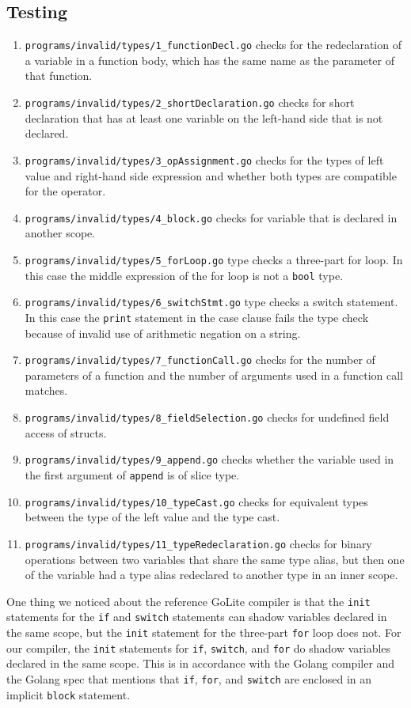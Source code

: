 \documentclass{article}
\begin{document}
\subsection*{Testing}
\begin{enumerate}
	\item \verb|programs/invalid/types/1_functionDecl.go| checks for the redeclaration of a variable in a function body, which has the same name as the parameter of that function.
	\item \verb|programs/invalid/types/2_shortDeclaration.go| checks for short declaration that has at least one variable on the left-hand side that is not declared.
	\item \verb|programs/invalid/types/3_opAssignment.go| checks for the types of left value and right-hand side expression and whether both types are compatible for the operator.
	\item \verb|programs/invalid/types/4_block.go| checks for variable that is declared in another scope.
	\item \verb|programs/invalid/types/5_forLoop.go| type checks a three-part for loop. In this case the middle expression of the for loop is not a \verb|bool| type.
	\item \verb|programs/invalid/types/6_switchStmt.go| type checks a switch statement. In this case the \verb|print| statement in the case clause fails the type check because of invalid use of arithmetic negation on a string.
	\item \verb|programs/invalid/types/7_functionCall.go| checks for the number of parameters of a function and the number of arguments used in a function call matches.
	\item \verb|programs/invalid/types/8_fieldSelection.go| checks for undefined field access of structs.
	\item \verb|programs/invalid/types/9_append.go| checks whether the variable used in the first argument of \verb|append| is of slice type.
	\item \verb|programs/invalid/types/10_typeCast.go| checks for equivalent types between the type of the left value and the type cast.
	\item \verb|programs/invalid/types/11_typeRedeclaration.go| checks for binary operations between two variables that share the same type alias, but then one of the variable had a type alias redeclared to another type in an inner scope.
\end{enumerate}

One thing we noticed about the reference GoLite compiler is that the \verb|init| statements for the \verb|if| and \verb|switch| statements can shadow variables declared in the same scope, but the \verb|init| statement for the three-part \verb|for| loop does not. For our compiler, the \verb|init| statements for \verb|if|, \verb|switch|, and \verb|for| do shadow variables declared in the same scope.
This is in accordance with the Golang compiler and the Golang spec that mentions
that \verb|if|, \verb|for|, and \verb|switch| are enclosed in an implicit \verb|block|
statement.
\end{document}
